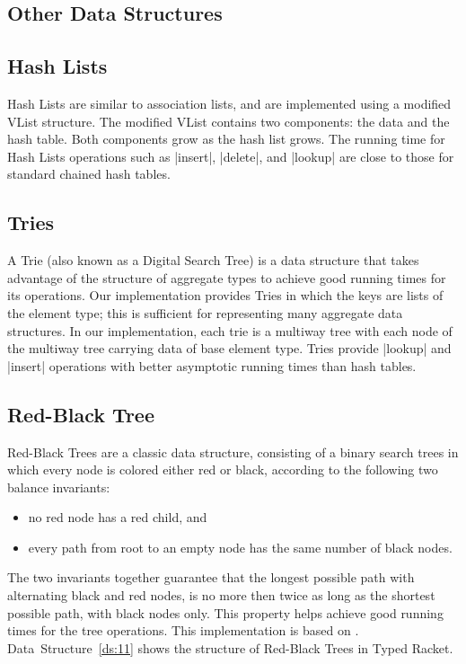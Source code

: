 \subsection{Other Data Structures}
\subsection*{Hash Lists}
Hash Lists \citep{bagwell-lists} are similar to association lists, and
are implemented using a modified VList structure. The modified VList
contains two components: the data and the hash table. Both components
grow as the hash list grows. The running time for Hash Lists operations
such as \scheme|insert|, \scheme|delete|, and \scheme|lookup| are close
to those for standard chained hash tables.

\subsection*{Tries}
A Trie (also known as a Digital Search Tree) \citep{oka} is a data
structure that takes advantage of the structure of aggregate types to
achieve good running times for its operations. Our implementation
provides Tries in which the keys are lists of the element type; this is
sufficient for representing many aggregate data structures. In our
implementation, each trie is a multiway tree with each node of the
multiway tree carrying data of base element type.  Tries provide
\scheme|lookup| and \scheme|insert| operations with better asymptotic
running times than hash tables.

\subsection*{Red-Black Tree}
Red-Black Trees \citep{red-black} are a classic data structure,
consisting of a binary search trees in which every node is colored
either red or black, according to the following two balance invariants:

\begin{itemize}
\item{no red node has a red child, and}
\item{every path from root to an empty node has the same number of black
  nodes.}
\end{itemize}
  
The two invariants together guarantee that the longest possible path
with alternating black and red nodes, is no more then twice as long as
the shortest possible path, with black nodes only. This property helps
achieve good running times for the tree operations. This implementation
is based on \citet{oka-red-black}. Data~Structure~\ref{ds:11} shows the
structure of Red-Black Trees in Typed Racket.

